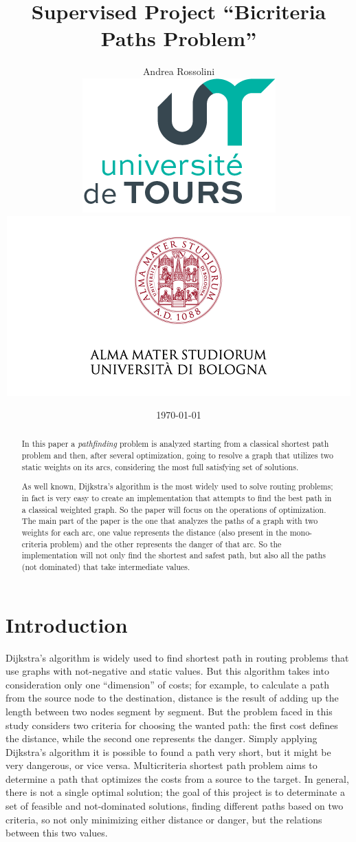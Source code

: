 \documentclass[a4paper,11pt]{report}
\title{Supervised Project ``Bicriteria Paths Problem''
\\
	}
\author{Andrea Rossolini\\
	\includegraphics[scale=0.9]{img/univToursLogo.png}
	\includegraphics[scale=0.6, trim= 0 8mm 0 0, clip]{img/uniboLogo.png}}
\date{\today}
\begin{document}
 
\maketitle

\begin{abstract}
In this paper a \textit{pathfinding} problem is analyzed starting from a classical shortest path problem and then, after several optimization, going to resolve a graph that utilizes two static weights on its arcs, considering the most full satisfying set of solutions.

As well known, Dijkstra's algorithm is the most widely used to solve routing problems; in fact is very easy to create an implementation that attempts to find the best path in a classical weighted graph. So the paper will focus on the operations of optimization.
%
The main part of the paper is the one that analyzes the paths of a graph with two weights for each arc, one value represents the distance (also present in the mono-criteria problem) and the other represents the danger of that arc. So the implementation will not only find the shortest and safest path, but also all the paths (not dominated) that take intermediate values.
\end{abstract}

\tableofcontents

\chapter{Introduction}
Dijkstra's algorithm is widely used to find shortest path in routing problems that use graphs with not-negative and static values. But this algorithm takes into consideration only one ``dimension'' of costs; for example, to calculate a path from the source node to the destination, distance is the result of adding up the length between two nodes segment by segment.
%
But the problem faced in this study considers two criteria for choosing the wanted path: the first cost defines the distance, while the second one represents the danger. Simply applying Dijkstra's algorithm it is possible to found a path very short, but it might be very dangerous, or vice versa. Multicriteria shortest path problem aims to determine a path that optimizes the costs from a source to the target. In general, there is not a single optimal solution; the goal of this project is to determinate a set of feasible and not-dominated solutions, finding different paths based on two criteria, so not only minimizing either distance or danger, but the relations between this two values.
\vspace{5mm}
\end{document}
